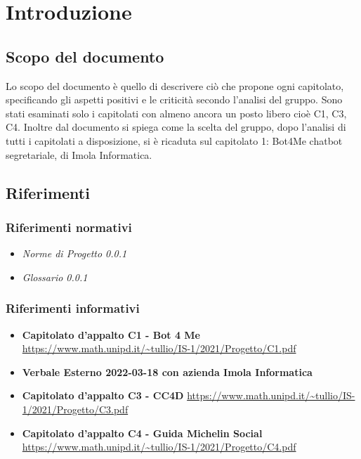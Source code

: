\section{Introduzione}
		\subsection {Scopo del documento}
		Lo scopo del documento è quello di descrivere ciò che propone ogni capitolato, specificando gli aspetti positivi e le criticità secondo l'analisi del gruppo.
		\newline Sono stati esaminati solo i capitolati con almeno ancora un posto libero cioè C1, C3, C4. 
        Inoltre dal documento si spiega come la scelta del gruppo, dopo l'analisi di tutti i capitolati a disposizione, si è ricaduta sul capitolato 1: 
        Bot4Me chatbot segretariale, di Imola Informatica.
		\subsection {Riferimenti} 
			\subsubsection {Riferimenti normativi} 
			\begin{itemize}
				\item \textit{Norme di Progetto 0.0.1}
				\item \textit{Glossario 0.0.1}
			\end{itemize}
			\subsubsection {Riferimenti informativi} 
			\begin{itemize}
				\item \textbf{Capitolato d'appalto C1 - Bot 4 Me}\newline
				\url{https://www.math.unipd.it/~tullio/IS-1/2021/Progetto/C1.pdf}
				\item \textbf{Verbale Esterno 2022-03-18 con azienda Imola Informatica}
				\item \textbf{Capitolato d'appalto C3 - CC4D}\newline
				\url{https://www.math.unipd.it/~tullio/IS-1/2021/Progetto/C3.pdf}
				\item \textbf{Capitolato d'appalto C4 - Guida Michelin Social}\newline
				\url{https://www.math.unipd.it/~tullio/IS-1/2021/Progetto/C4.pdf}
			\end{itemize}
